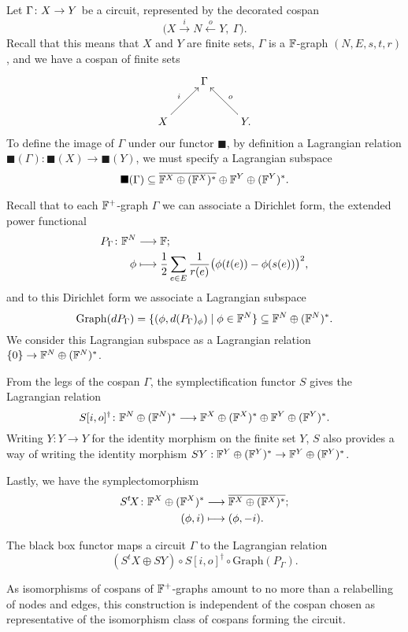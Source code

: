 Let $\Gamma{\colon} X \to Y$ be a circuit, represented by the decorated cospan
\[
  \big(X \stackrel{i}{\longrightarrow} N \stackrel{o}{\longleftarrow} Y,\:
  \Gamma\big).
\]
Recall that this means that $X$ and $Y$ are finite sets, $\Gamma$ is a
${\mathbb F}$-graph $(N,E,s,t,r)$, and we have a cospan of finite sets
\[
  \xymatrix{
    & \Gamma \\
    X \ar[ur]^{i} && Y. \ar[ul]_{o}
  }
\]
To define the image of $\Gamma$ under our functor $\blacksquare$, by definition
a Lagrangian relation $\blacksquare(\Gamma): \blacksquare(X) \to
\blacksquare(Y)$, we must specify a Lagrangian subspace 
\[
  \blacksquare(\Gamma) \subseteq \overline{{\mathbb F}^X \oplus ({\mathbb F}^X)^\ast} \oplus {\mathbb F}^Y
  \oplus ({\mathbb F}^Y)^\ast.  
\]

Recall that to each ${\mathbb F}^+$-graph $\Gamma$ we can associate a Dirichlet form, 
the extended power functional 
\begin{align*}
  P_\Gamma{\colon} {\mathbb F}^N &\longrightarrow {\mathbb F}; \\
  \phi &\longmapsto \frac{1}{2} \sum_{e \in E} \frac{1}{r(e)} \big( \phi(t(e)) -
  \phi(s(e))  \big)^2,
\end{align*}
and to this Dirichlet form we associate a Lagrangian subspace 
\[
  \mathrm{Graph}(dP_\Gamma) = \{(\phi,d(P_\Gamma)_\phi) \mid \phi \in {\mathbb F}^N\}
  \subseteq {\mathbb F}^N \oplus ({\mathbb F}^N)^\ast.
\]
We consider this Lagrangian subspace as a Lagrangian relation $\{0\} \to {\mathbb F}^N
\oplus ({\mathbb F}^N)^\ast$.

From the legs of the cospan $\Gamma$, the symplectification functor $S$ gives the
Lagrangian relation
\[
  S[i,o]^\dagger{\colon} {\mathbb F}^N \oplus ({\mathbb F}^N)^\ast \longrightarrow {\mathbb F}^X \oplus
  ({\mathbb F}^X)^\ast \oplus {\mathbb F}^Y \oplus ({\mathbb F}^Y)^\ast.
\]
Writing $Y: Y \to Y$ for the identity morphism on the finite set $Y$, $S$ also
provides a way of writing the identity morphism $SY: {\mathbb F}^Y \oplus ({\mathbb F}^Y)^\ast \to
{\mathbb F}^Y \oplus ({\mathbb F}^Y)^\ast$. 

Lastly, we have the symplectomorphism
\begin{align*}
  S^t\!X{\colon} {\mathbb F}^X \oplus ({\mathbb F}^X)^\ast &\longrightarrow \overline{{\mathbb F}^X \oplus
  ({\mathbb F}^X)^\ast}; \\
  (\phi,i) &\longmapsto (\phi,-i).
\end{align*}

The black box functor maps a circuit $\Gamma$ to the Lagrangian relation
\[
  (S^t\!X\oplus SY) \circ S[i,o]^\dagger \circ \mathrm{Graph}(P_\Gamma).
\]

As isomorphisms of cospans of ${\mathbb F}^+$-graphs amount to no more than a 
relabelling of nodes and edges, this construction is independent of the cospan 
chosen as representative of the isomorphism class of cospans forming the 
circuit.


